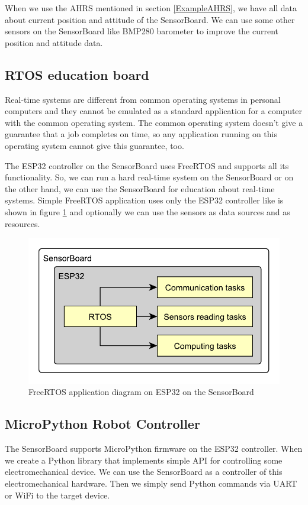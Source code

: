 When we use the \ac{AHRS} mentioned in section \ref{ExampleAHRS}, we have all data about current position and attitude of the SensorBoard. We can use some other sensors on the SensorBoard like BMP280 barometer \cite{bosch:BMP280} to improve the current position and attitude data.

\subsection{RTOS education board}
Real-time systems are different from common operating systems in personal computers and they cannot be emulated as a standard application for a computer with the common operating system. The common operating system doesn't give a guarantee that a job completes on time, so any application running on this operating system cannot give this guarantee, too.

The ESP32 controller on the SensorBoard uses FreeRTOS and supports all its functionality. \cite{ESP32FreeRTOS} So, we can run a hard real-time system on the SensorBoard or on the other hand, we can use the SensorBoard for education about real-time systems. Simple FreeRTOS application uses only the ESP32 controller like is shown in figure \ref{UEFreeRTOS} and optionally we can use the sensors as data sources and as resources.

\begin{figure}
	\centering
	\label{UEFreeRTOS}
	\caption{FreeRTOS application diagram on ESP32 on the SensorBoard}
	\includegraphics[scale=1]{img/UsageExamplesRTOS.pdf}
\end{figure}

\subsection{MicroPython Robot Controller}
The SensorBoard supports MicroPython firmware \cite{MicroPython} on the ESP32 controller. When we create a Python library that implements simple \ac{API} for controlling some electromechanical device. We can use the SensorBoard as a controller of this electromechanical hardware. Then we simply send Python commands via UART or WiFi to the target device.


